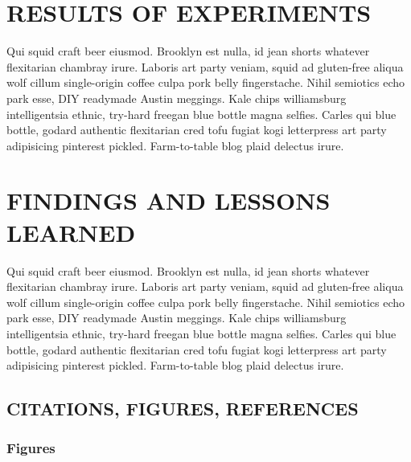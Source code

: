 \section{RESULTS OF EXPERIMENTS}
\label{sec:results}

Qui squid craft beer eiusmod. Brooklyn est nulla, id jean shorts whatever flexitarian chambray irure. Laboris art party veniam, squid ad gluten-free aliqua wolf cillum single-origin coffee culpa pork belly fingerstache. Nihil semiotics echo park esse, DIY readymade Austin meggings. Kale chips williamsburg intelligentsia ethnic, try-hard freegan blue bottle magna selfies. Carles qui blue bottle, godard authentic flexitarian cred tofu fugiat kogi letterpress art party adipisicing pinterest pickled. Farm-to-table blog plaid delectus irure.



\section{FINDINGS AND LESSONS LEARNED}
\label{sec:conclusion}

Qui squid craft beer eiusmod. Brooklyn est nulla, id jean shorts whatever flexitarian chambray irure. Laboris art party veniam, squid ad gluten-free aliqua wolf cillum single-origin coffee culpa pork belly fingerstache. Nihil semiotics echo park esse, DIY readymade Austin meggings. Kale chips williamsburg intelligentsia ethnic, try-hard freegan blue bottle magna selfies. Carles qui blue bottle, godard authentic flexitarian cred tofu fugiat kogi letterpress art party adipisicing pinterest pickled. Farm-to-table blog plaid delectus irure.




\subsection{CITATIONS, FIGURES, REFERENCES}

\subsubsection{Figures} 

